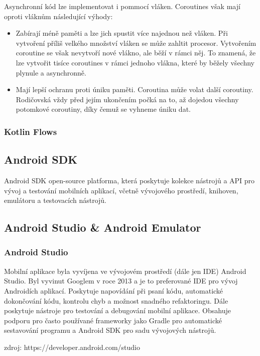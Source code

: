 Asynchronní kód lze implementovat i pommocí vláken. Coroutines však mají oproti vláknům následující výhody:

\begin{itemize}
	\item Zabírají méně paměti a lze jich spustit více najednou než vláken. Při vytvoření příliš velkého množství vláken se může zahltit procesor. Vytvořením coroutine se však nevytvoří nové vlákno, ale běží v rámci něj. To znamená, že lze vytvořit tisíce coroutines v rámci jednoho vlákna, které by běžely všechny plynule a asynchronně.
	\item Mají lepší ochranu proti úniku paměti.
	Coroutina může volat další coroutiny. Rodičovská vždy před jejím ukončením počká na to, až dojedou všechny potomkové coroutiny, díky čemuž se vyhneme úniku dat.
\end{itemize}

\subsubsection* {Kotlin Flows}

\subsection{Android SDK}
Android SDK open-source platforma, která poskytuje kolekce nástrojů a API pro vývoj a testování mobilních aplikací, včetně vývojového prostředí, knihoven, emulátoru a testovacích nástrojů.

\subsection {Android Studio \& Android Emulator}

\subsubsection *{Android Studio}

Mobilní aplikace byla vyvíjena ve vývojovém prostředí (dále jen IDE) Android Studio. Byl vyvinut Googlem v roce 2013 a je to preferované IDE pro vývoj Androidích aplikací. Poskytuje napovídání při psaní kódu, automatické dokončování kódu, kontrolu chyb a možnost snadného refaktoringu. Dále poskytuje nástroje pro testování a debugování mobilní aplikace. Obsahuje podporu pro často používané frameworky jako Gradle pro automatické sestavování programu a Android SDK pro sadu vývojových nástrojů.

zdroj: https://developer.android.com/studio

